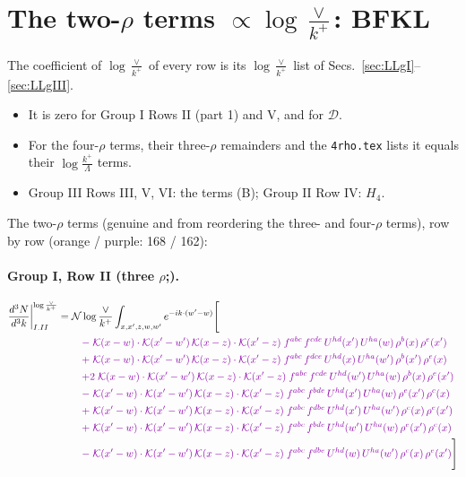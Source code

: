 \documentclass[10pt]{article}
\numberwithin{equation}{section}
\newcommand{\NNv}{\mathcal N\log\frac{\vee}{k^+}}
\begin{document}
\section{The two-$\rho$ terms $\propto\log\frac{\vee}{k^+}$: BFKL}\label{sec:bfkl}
The coefficient of $\log\frac{\vee}{k^+}$ of every row is its $\log\frac{\vee}{k^+}$ list of Secs.~\ref{sec:LLgI}--\ref{sec:LLgIII}.
\begin{itemize}
\item It is zero for Group I Rows II (part 1) and V, and for $\mathcal D$.
\item For the four-$\rho$ terms, their three-$\rho$ remainders and the \texttt{4rho.tex} lists it equals their $\log\frac{k^+}{\Lambda}$ terms.
\item Group III Rows III, V, VI: the terms (B); Group II Row IV: $H_4$.
\end{itemize}
The two-$\rho$ terms (genuine and from reordering the three- and four-$\rho$ terms), row by row (orange / purple: 168 / 162):
\paragraph{Group I, Row II (three $\rho$;).}
\begin{align}
\frac{d^3N}{d^3k}\bigg|^{\log\frac{\vee}{k^+}}_{I.II}={}&\NNv\int_{x,x',z,w,w'}e^{-ik\cdot(w'-w)}\Bigg[\notag\\
&\quad{\color{CC}-\;\mathcal{K}(x-w)\cdot\mathcal{K}(x'-w')\,\mathcal{K}(x-z)\cdot\mathcal{K}(x'-z)\;f^{abc}\,f^{cde}\,U^{hd}(x')\,U^{ha}(w)\,\rho^{b}(x)\,\rho^{e}(x')}\notag\\
&\quad{\color{CC}+\;\mathcal{K}(x-w)\cdot\mathcal{K}(x'-w')\,\mathcal{K}(x-z)\cdot\mathcal{K}(x'-z)\;f^{abc}\,f^{dce}\,U^{hd}(x)\,U^{ha}(w')\,\rho^{b}(x')\,\rho^{e}(x)}\notag\\
&\quad{\color{CC}+2\;\mathcal{K}(x-w)\cdot\mathcal{K}(x'-w')\,\mathcal{K}(x-z)\cdot\mathcal{K}(x'-z)\;f^{abc}\,f^{cde}\,U^{hd}(w')\,U^{ha}(w)\,\rho^{b}(x)\,\rho^{e}(x')}\notag\\
&\quad{\color{CC}-\;\mathcal{K}(x'-w)\cdot\mathcal{K}(x'-w')\,\mathcal{K}(x-z)\cdot\mathcal{K}(x'-z)\;f^{abc}\,f^{bde}\,U^{hd}(x')\,U^{ha}(w)\,\rho^{e}(x')\,\rho^{c}(x)}\notag\\
&\quad{\color{CC}+\;\mathcal{K}(x'-w)\cdot\mathcal{K}(x'-w')\,\mathcal{K}(x-z)\cdot\mathcal{K}(x'-z)\;f^{abc}\,f^{dbe}\,U^{hd}(x')\,U^{ha}(w')\,\rho^{c}(x)\,\rho^{e}(x')}\notag\\
&\quad{\color{CC}+\;\mathcal{K}(x'-w)\cdot\mathcal{K}(x'-w')\,\mathcal{K}(x-z)\cdot\mathcal{K}(x'-z)\;f^{abc}\,f^{bde}\,U^{hd}(w')\,U^{ha}(w)\,\rho^{e}(x')\,\rho^{c}(x)}\notag\\
&\quad{\color{CC}-\;\mathcal{K}(x'-w)\cdot\mathcal{K}(x'-w')\,\mathcal{K}(x-z)\cdot\mathcal{K}(x'-z)\;f^{abc}\,f^{dbe}\,U^{hd}(w)\,U^{ha}(w')\,\rho^{c}(x)\,\rho^{e}(x')}\Bigg]\label{eq:P0}
\end{align}
\end{document}
